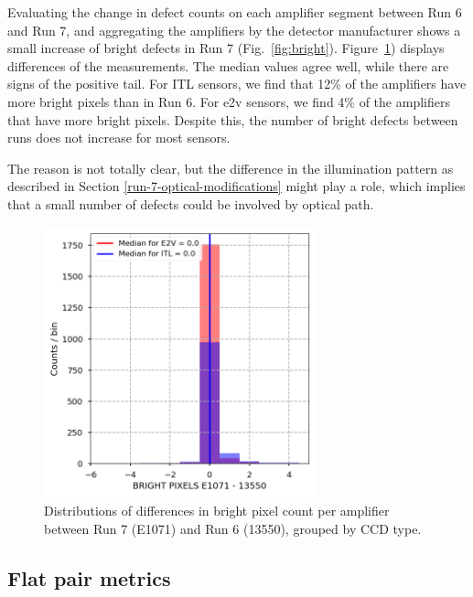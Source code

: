 Evaluating the change in defect counts on each amplifier segment between Run 6 and Run 7, and aggregating the amplifiers by the detector manufacturer shows a small increase of bright defects in Run 7 (Fig.~\ref{fig:bright}). Figure~\ref{fig:dark-dist}) displays differences of the measurements. The median values agree well, while there are signs of the positive tail. For ITL sensors, we find that 12\% of the amplifiers have more bright pixels than in Run 6. For e2v sensors, we find 4\% of the amplifiers that have more bright pixels. Despite this, the number of bright defects between runs does not increase for most sensors.

The reason is not totally clear, but the difference in the illumination pattern as described in Section \ref{run-7-optical-modifications} might play a role, which implies that a small number of defects could be involved by optical path.

\begin{figure}[ht]
\begin{centering}
\includegraphics[width=0.7\textwidth]{figures/baselineCharacterization/BRIGHT_PIXELS_13550_E1071_diff.png}
\caption{Distributions of differences in bright pixel count per amplifier between Run 7 (E1071) and Run 6 (13550), grouped by CCD type.}
\label{fig:dark-dist}
\end{centering}
\end{figure}

\subsection{Flat pair metrics}\label{flat-pair-metrics}


